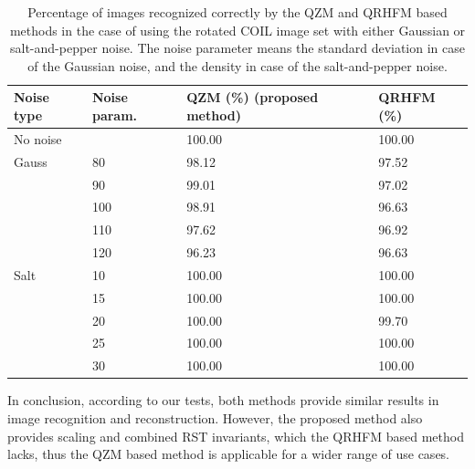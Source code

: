\begin{table}
    \centering
    \begin{tabular}{|p{2.15cm}|p{1.8cm}|p{3.3cm}<{\raggedright}|p{2.74cm}|} \hline
        \textbf{Noise type} & \textbf{Noise param.} & \textbf{QZM} (\%) \linebreak (proposed method) & \textbf{QRHFM} (\%) \\ \hline\hline
        No noise & & 100.00 & 100.00 \\ \hline\hline
        Gauss & 80 & 98.12 & 97.52 \\ \cline{2-4}
        & 90 & 99.01 & 97.02 \\ \cline{2-4}
        & 100 & 98.91 & 96.63 \\ \cline{2-4}
        & 110 & 97.62 & 96.92 \\ \cline{2-4}
        & 120 & 96.23 & 96.63 \\ \hline\hline
        Salt & 10 & 100.00 & 100.00 \\ \cline{2-4}
        & 15 & 100.00 & 100.00 \\ \cline{2-4}
        & 20 & 100.00 & 99.70 \\ \cline{2-4}
        & 25 & 100.00 & 100.00 \\ \cline{2-4}
        & 30 & 100.00 & 100.00 \\ \cline{1-4}
    \end{tabular}
    \caption{Percentage of images recognized correctly by the QZM and QRHFM based methods in the case of using the rotated COIL image set with either Gaussian or salt-and-pepper noise. The noise parameter means the standard deviation in case of the Gaussian noise, and the density in case of the salt-and-pepper noise.}
    \label{tab:recognition_qrhfm}
\end{table}

In conclusion, according to our tests, both methods provide similar results in image recognition and reconstruction. However, the proposed method also provides scaling and combined RST invariants, which the QRHFM based method lacks, thus the QZM based method is applicable for a wider range of use cases.
